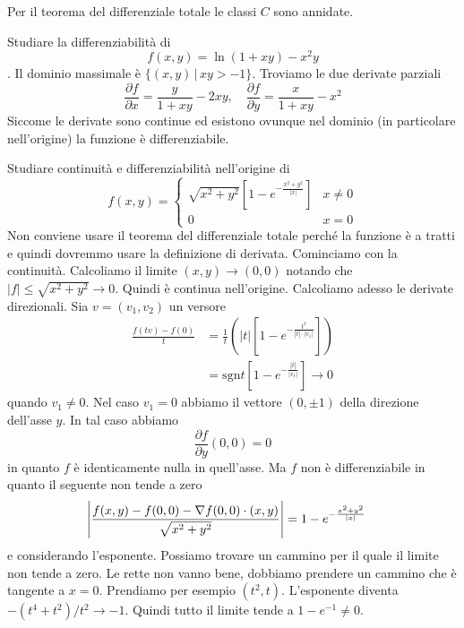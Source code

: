 \documentclass[a4paper]{article}
\begin{document}
\begin{radioactive}
Per il teorema del differenziale totale
le classi \(C\) sono annidate.

\begin{snippetexercise}{}
    Studiare la differenziabilità di \[f(x,y) = \ln(1 + xy)-x^2y\].
    Il dominio massimale è \(\{(x,y) \,|\, xy > -1\}\).
    Troviamo le due derivate parziali
    \[
        \frac{\partial f}{\partial x} = \frac{y}{1 + xy} - 2xy,
        \quad
        \frac{\partial f}{\partial y} = \frac{x}{1 + xy} - x^2
    \]
    Siccome le derivate sono continue ed esistono ovunque nel dominio (in particolare nell'origine)
    la funzione è differenziabile.
\end{snippetexercise}
\end{radioactive}

\begin{radioactive}
\begin{snippetexercise}{}
    Studiare continuità e differenziabilità nell'origine di \[
        f(x,y) = \begin{cases}
            \sqrt{x^2 + y^2} \left[ 1 - e^{-\frac{x^2 + y^2}{|x|}}\right] & x \neq 0 \\
            0 & x=0
        \end{cases}
    \]
    Non conviene usare il teorema del differenziale totale perché la funzione è a tratti
    e quindi dovremmo usare la definizione di derivata.
    Cominciamo con la continuità.
    Calcoliamo il limite \((x,y) \to (0,0)\)
    notando che \(|f| \leq \sqrt{x^2 + y^2} \to 0\).
    Quindi è continua nell'origine. Calcoliamo adesso le derivate direzionali.
    Sia \(v = (v_1, v_2)\) un versore
    \begin{align*}
        \frac{f(tv) - f(0)}{t} &= \frac{1}{t} \left(
            |t| \left[1 - e^{-\frac{t^2}{|t| \cdot |v_1|}}\right]
        \right) \\
        &= \text{sgn} t \left[1 - e^{- \frac{|t|}{|v_1|}}\right] \to 0
    \end{align*}
    quando \(v_1 \neq 0\).
    Nel caso \(v_1 = 0\) abbiamo il vettore \((0, \pm 1)\) della direzione dell'asse \(y\).
    In tal caso abbiamo
    \[
        \frac{\partial f}{\partial y} (0,0) = 0
    \]
    in quanto \(f\) è identicamente nulla in quell'asse.
    Ma \(f\) non è differenziabile in quanto il seguente non tende a zero
    \begin{align*}
        \left|
            \frac{
                f(x,y) - f(0,0) - \nabla f(0,0) \cdot (x,y)
            }{\sqrt{x^2 +y^2}}
        \right|
        &= 1 - e^{-\frac{x^2 + y^2}{|x|}}
    \end{align*}
    e considerando l'esponente. Possiamo trovare un cammino per il quale il limite non tende a zero.
    Le rette non vanno bene, dobbiamo prendere un cammino che è tangente a \(x=0\).
    Prendiamo per esempio \((t^2, t)\). L'esponente diventa \(-(t^4 + t^2)/t^2 \to -1\).
    Quindi tutto il limite tende a \(1-e^{-1} \neq 0\).
\end{snippetexercise}
\end{radioactive}
\end{document}
